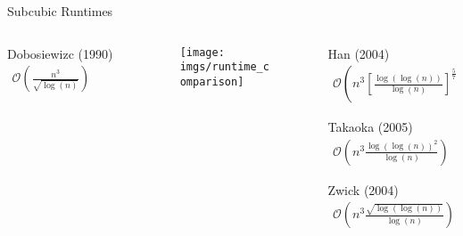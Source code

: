 \begin{frame}{Subcubic Runtimes}
\begin{columns}
\begin{column}{.252\linewidth}
            {
                \begin{alertblock}{Dobosiewizc (1990)}
                    $\begin{aligned}
                        \mathcal{O}\left( \frac{n^3}{\sqrt{\log(n)}} \right)
                    \end{aligned}$
                \end{alertblock}
            }
        \end{column}
        \begin{column}{.48\linewidth}
            \begin{figure}
                \texttt{[image: imgs/runtime\_comparison]}
            \end{figure}
        \end{column}
        \begin{column}{.25\linewidth}
            {
                \begin{alertblock}{Han (2004)}
                    $\begin{aligned}
                        \mathcal{O}\left( n^3 {\left[ \frac{\log(\log(n))}{\log(n)} \right]}^{\frac{5}{7}} \right)
                    \end{aligned}$
                \end{alertblock}
            }
            
            {
                \begin{alertblock}{Takaoka (2005)}
                    $\begin{aligned}
                        \mathcal{O}\left( n^3 \frac{{\log(\log(n))}^2}{\log(n)} \right)
                    \end{aligned}$
                \end{alertblock}
            }
            
            {
                \begin{alertblock}{Zwick (2004)}
                    $\begin{aligned}
                        \mathcal{O}\left( n^3 \frac{\sqrt{\log(\log(n))}}{\log(n)} \right)
                    \end{aligned}$
                \end{alertblock}
            }
            

\end{column}
\end{columns}
\end{frame}
